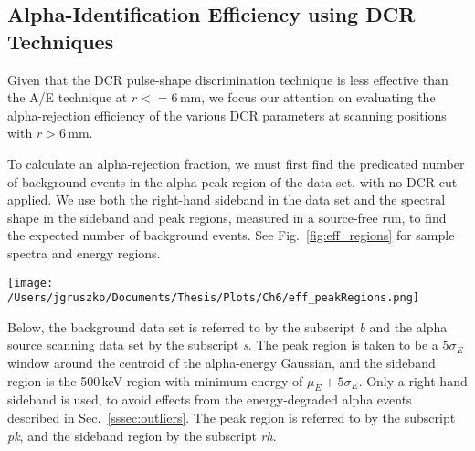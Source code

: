 \subsection{Alpha-Identification Efficiency using DCR Techniques}
Given that the DCR pulse-shape discrimination technique is less effective than the A/E technique at $r<=6$\,mm, we focus our attention on evaluating the alpha-rejection efficiency of the various DCR parameters at scanning positions with $r>6$\,mm. 

To calculate an alpha-rejection fraction, we must first find the predicated number of background events in the alpha peak region of the data set, with no DCR cut applied. We use both the right-hand sideband in the data set and the spectral shape in the sideband and peak regions, measured in a source-free run, to find the expected number of background events. See Fig.~\ref{fig:eff_regions} for sample spectra and energy regions. 

\begin{figure*}[]
 \centering
 \texttt{[image: /Users/jgruszko/Documents/Thesis/Plots/Ch6/eff\_peakRegions.png]}
 \caption[Energy spectra, showing the windows used to calculate the DCR alpha rejection efficiency]{Energy spectra for a source scan data set with $r=9$\,mm {\it (left)} and a background data set {\it (right)}. The energy windows indicated are the $5\sigma$ peak region, in red, and the 500\,keV right-hand sideband, in blue. $n_{s, pk}$ is the sum of all events in the red solid-lined box and $n_{s, rh}$ is the sum of all the events in the blue solid-lined box. $n_{b, pk}$ and $n_{b, rh}$ are the sum of events in the red and blue dashed-line boxes, respectively.} 
 \label{fig:eff_regions}
\end{figure*}

Below, the background data set is referred to by the subscript {\it b} and the alpha source scanning data set by the subscript {\it s}. The peak region is taken to be a $5\sigma_E$ window around the centroid of the alpha-energy Gaussian, and the sideband region is the 500\,keV region with minimum energy of $\mu_E+5\sigma_E$. Only a right-hand sideband is used, to avoid effects from the energy-degraded alpha events described in Sec.~\ref{sssec:outliers}. The peak region is referred to by the subscript {\it pk}, and the sideband region by the subscript {\it rh}.

